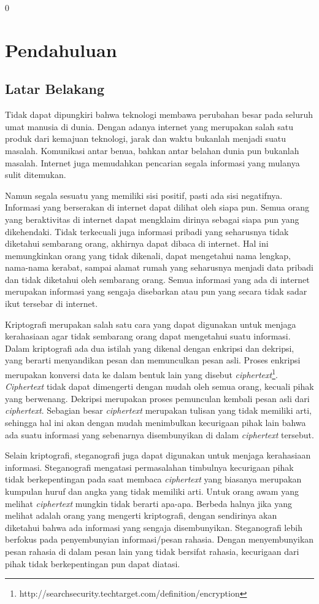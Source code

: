 0\chapter{Pendahuluan}
\label{chap:pendahuluan}

\section{Latar Belakang}
\label{sec:latarbelakang}

Tidak dapat dipungkiri bahwa teknologi membawa perubahan besar pada seluruh umat manusia di dunia. Dengan adanya internet yang merupakan salah satu produk dari kemajuan teknologi, jarak dan waktu bukanlah menjadi suatu masalah. Komunikasi antar benua, bahkan antar belahan dunia pun bukanlah masalah. Internet juga memudahkan pencarian segala informasi yang mulanya sulit ditemukan.

Namun segala sesuatu yang memiliki sisi positif, pasti ada sisi negatifnya. Informasi yang berserakan di internet dapat dilihat oleh siapa pun. Semua orang yang beraktivitas di internet dapat mengklaim dirinya sebagai siapa pun yang dikehendaki. Tidak terkecuali juga informasi pribadi yang seharusnya tidak diketahui sembarang orang, akhirnya dapat dibaca di internet. Hal ini memungkinkan orang yang tidak dikenali, dapat mengetahui nama lengkap, nama-nama kerabat, sampai alamat rumah yang seharusnya menjadi data pribadi dan tidak diketahui oleh sembarang orang. Semua informasi yang ada di internet merupakan informasi yang sengaja disebarkan atau pun yang secara tidak sadar ikut tersebar di internet.

Kriptografi merupakan salah satu cara yang dapat digunakan untuk menjaga kerahasiaan agar tidak sembarang orang dapat mengetahui suatu informasi. Dalam kriptografi ada dua istilah yang dikenal dengan enkripsi dan dekripsi, yang berarti menyandikan pesan dan memunculkan pesan asli. Proses enkripsi merupakan konversi data ke dalam bentuk lain yang disebut \textit{ciphertext}\footnote{http://searchsecurity.techtarget.com/definition/encryption}. \textit{Ciphertext} tidak dapat dimengerti dengan mudah oleh semua orang, kecuali pihak yang berwenang. Dekripsi merupakan proses pemunculan kembali pesan asli dari \textit{ciphertext}. Sebagian besar \textit{ciphertext} merupakan tulisan yang tidak memiliki arti, sehingga hal ini akan dengan mudah menimbulkan kecurigaan pihak lain bahwa ada suatu informasi yang sebenarnya disembunyikan di dalam \textit{ciphertext} tersebut.

Selain kriptografi, steganografi juga dapat digunakan untuk menjaga kerahasiaan informasi. Steganografi mengatasi permasalahan timbulnya kecurigaan pihak tidak berkepentingan pada saat membaca \textit{ciphertext} yang biasanya merupakan kumpulan huruf dan angka yang tidak memiliki arti. Untuk orang awam yang melihat \textit{ciphertext} mungkin tidak berarti apa-apa. Berbeda halnya jika yang melihat adalah orang yang mengerti kriptografi, dengan sendirinya akan diketahui bahwa ada informasi yang sengaja disembunyikan. Steganografi lebih berfokus pada penyembunyian informasi/pesan rahasia. Dengan menyembunyikan pesan rahasia di dalam pesan lain yang tidak bersifat rahasia, kecurigaan dari pihak tidak berkepentingan pun dapat diatasi.

